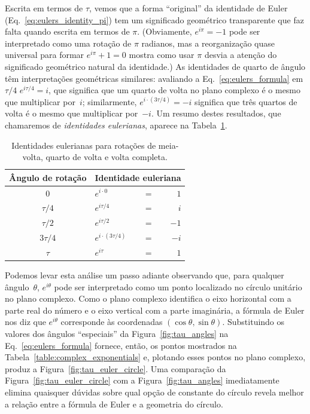 Escrita em termos de $\tau$, vemos que a forma ``original'' da identidade de Euler (Eq.~\eqref{eq:eulers_identity_pi}) tem um significado geométrico transparente que faz falta quando escrita em termos de $\pi$. (Obviamente, $e^{i\pi} = -1$ pode ser interpretado como uma rotação de $\pi$ radianos, mas a reorganização quase universal para formar $e^{i\pi} + 1 = 0$ mostra como usar $\pi$ desvia a atenção do significado geométrico natural da identidade.) As identidades de quarto de ângulo têm interpretações geométricas similares: avaliando a Eq.~\eqref{eq:eulers_formula} em $\tau/4$  $e^{i\tau/4} = i$, que significa que um quarto de volta no plano complexo é o mesmo que multiplicar por~$i$; similarmente, $e^{i\cdot(3\tau/4)} = -i$ significa que três quartos de volta é o mesmo que multiplicar por~$-i$. Um resumo destes resultados, que chamaremos de \emph{identidades eulerianas}, aparece na Tabela~\ref{table:eulerian_identities}.

\begin{table}
\begin{center}
\begin{tabular}{cllr}
Ângulo de rotação & \multicolumn{3}{c}{Identidade euleriana} \\ \hline
$0$ & $e^{i\cdot0}$ & $ = $ & $1$ \smallskip \\
$\tau/4$ & $e^{i\tau/4}$ & $ = $ & $i$ \smallskip \\
$\tau/2$ & $e^{i\tau/2}$ & $ = $ & $-1$ \smallskip \\
$3\tau/4$ & $e^{i\cdot(3\tau/4)}$ & $ = $ & $-i$ \smallskip \\
$\tau$ & $e^{i\tau}$ & $ = $ & $1$
\end{tabular}
\end{center}
\caption{Identidades eulerianas para rotações de meia-volta, quarto de volta e volta completa.\label{table:eulerian_identities}}
\end{table}

Podemos levar esta análise um passo adiante observando que, para qualquer ângulo~$\theta$, $e^{i\theta}$ pode ser interpretado como um ponto localizado no círculo unitário no plano complexo. Como o plano complexo identifica o eixo horizontal com a parte real do número e o eixo vertical com a parte imaginária, a fórmula de Euler nos diz que $e^{i\theta}$ corresponde às coordenadas $(\cos\theta, \sin\theta)$. Substituindo os valores dos ângulos ``especiais'' da Figura~\ref{fig:tau_angles} na Eq.~\eqref{eq:eulers_formula} fornece, então, os pontos mostrados na Tabela~\ref{table:complex_exponentials} e, plotando esses pontos no plano complexo, produz a Figura~\ref{fig:tau_euler_circle}. Uma comparação da Figura~\ref{fig:tau_euler_circle} com a Figura~\ref{fig:tau_angles} imediatamente elimina quaisquer dúvidas sobre qual opção de constante do círculo revela melhor a relação entre a fórmula de Euler e a geometria do círculo.

